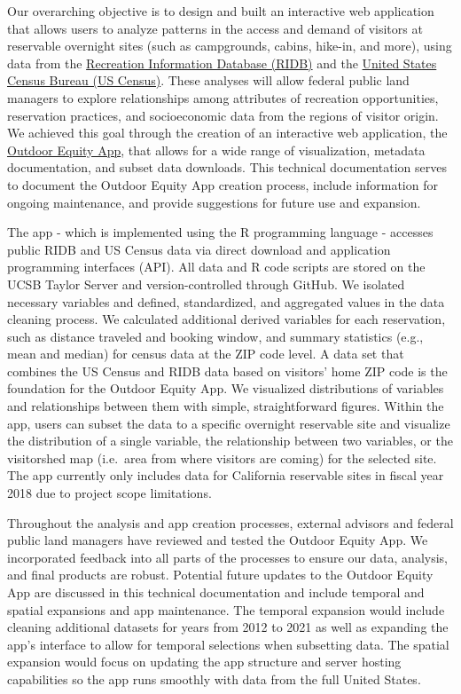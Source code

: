 \documentclass[
]{book}
\begin{document}
Our overarching objective is to design and built an interactive web application that allows users to analyze patterns in the access and demand of visitors at reservable overnight sites (such as campgrounds, cabins, hike-in, and more), using data from the \href{https://ridb.recreation.gov/landing}{Recreation Information Database (RIDB)} and the \href{https://www.census.gov/data.html}{United States Census Bureau (US Census)}. These analyses will allow federal public land managers to explore relationships among attributes of recreation opportunities, reservation practices, and socioeconomic data from the regions of visitor origin. We achieved this goal through the creation of an interactive web application, the \href{https://shinyapps.bren.ucsb.edu/oe_app/}{Outdoor Equity App}, that allows for a wide range of visualization, metadata documentation, and subset data downloads. This technical documentation serves to document the Outdoor Equity App creation process, include information for ongoing maintenance, and provide suggestions for future use and expansion.

The app - which is implemented using the R programming language - accesses public RIDB and US Census data via direct download and application programming interfaces (API). All data and R code scripts are stored on the UCSB Taylor Server and version-controlled through GitHub. We isolated necessary variables and defined, standardized, and aggregated values in the data cleaning process. We calculated additional derived variables for each reservation, such as distance traveled and booking window, and summary statistics (e.g., mean and median) for census data at the ZIP code level. A data set that combines the US Census and RIDB data based on visitors' home ZIP code is the foundation for the Outdoor Equity App. We visualized distributions of variables and relationships between them with simple, straightforward figures. Within the app, users can subset the data to a specific overnight reservable site and visualize the distribution of a single variable, the relationship between two variables, or the visitorshed map (i.e.~area from where visitors are coming) for the selected site. The app currently only includes data for California reservable sites in fiscal year 2018 due to project scope limitations.

Throughout the analysis and app creation processes, external advisors and federal public land managers have reviewed and tested the Outdoor Equity App. We incorporated feedback into all parts of the processes to ensure our data, analysis, and final products are robust. Potential future updates to the Outdoor Equity App are discussed in this technical documentation and include temporal and spatial expansions and app maintenance. The temporal expansion would include cleaning additional datasets for years from 2012 to 2021 as well as expanding the app's interface to allow for temporal selections when subsetting data. The spatial expansion would focus on updating the app structure and server hosting capabilities so the app runs smoothly with data from the full United States.
\end{document}
